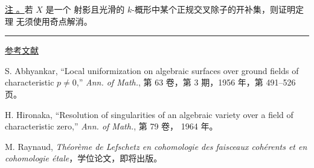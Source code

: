 
\underline{注 。}若 $X$ 是一个
射影且光滑的 $k$-概形中某个正规交叉除子的开补集，则证明定理
 无须使用奇点解消。

\begin{center}\rule{1.5cm}{0.4pt}\end{center}
\begin{center}\underline{参考文献}\end{center}

\begin{enumerate}[label={[\arabic*]},leftmargin=3em]
\item S. Abhyankar, ``Local uniformization on algebraic surfaces over
ground fields of characteristic $p\neq0$,'' \emph{Ann. of Math.},
第 63 卷，第 3 期，1956 年，第 491--526 页。

\item H. Hironaka, ``Resolution of singularities of an algebraic variety
over a field of characteristic zero,'' \emph{Ann. of Math.}, 第 79 卷，
1964 年。

\item M. Raynaud, \emph{Th\'eor\`eme de Lefschetz en cohomologie des
faisceaux coh\'erents et en cohomologie \'etale}，学位论文，即将出版。
\end{enumerate}
